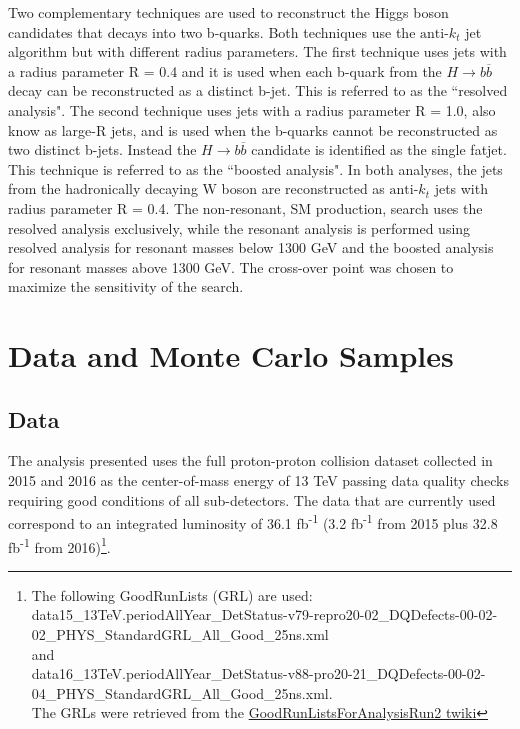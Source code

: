 
Two complementary techniques are used to reconstruct the Higgs boson candidates that decays into two b-quarks. Both techniques use the ${\textrm{anti-}k_{t}}$ jet algorithm but with different radius parameters. The first technique uses jets with a radius parameter R = 0.4 and it is used when each b-quark from the ${H\rightarrow b\overline{b}}$ decay can be reconstructed as a distinct b-jet. This is referred to as the ``resolved analysis"\cite{DiMicco:2151893}. The second technique uses jets with a radius parameter R = 1.0, also know as large-R jets, and is used when the b-quarks cannot be reconstructed as two distinct b-jets. Instead the ${H\rightarrow b\overline{b}}$ candidate is identified as the single fatjet. This technique is referred to as the ``boosted analysis"\cite{Issever:2276099}. In both analyses, the jets from the hadronically decaying W boson are reconstructed as ${\textrm{anti-}k_{t}}$ jets with radius parameter R = 0.4. The non-resonant, SM production, search uses the resolved analysis exclusively, while the resonant analysis is performed using resolved analysis for resonant masses below 1300 GeV and the boosted analysis for resonant masses above 1300 GeV. The cross-over point was chosen to maximize the sensitivity of the search.
\section{Data and Monte Carlo Samples}
\subsection{Data}
\indent The analysis presented uses the full proton-proton collision dataset collected in 2015 and 2016 as the center-of-mass energy of 13 TeV passing data quality checks requiring good conditions of all sub-detectors. The data that are currently used correspond to an integrated luminosity of 36.1 fb\textsuperscript{-1} (3.2 fb\textsuperscript{-1} from 2015 plus 32.8 fb\textsuperscript{-1} from 2016)\footnote{The following GoodRunLists (GRL) are used:\\  
data15\_13TeV.periodAllYear\_DetStatus-v79-repro20-02\_DQDefects-00-02-02\_PHYS\_StandardGRL\_All\_Good\_25ns.xml\\
and\\
data16\_13TeV.periodAllYear\_DetStatus-v88-pro20-21\_DQDefects-00-02-04\_PHYS\_StandardGRL\_All\_Good\_25ns.xml.\\
The GRLs were retrieved from the \href{https://twiki.cern.ch/twiki/bin/view/AtlasProtected/GoodRunListsForAnalysisRun2}{GoodRunListsForAnalysisRun2 twiki}}.

